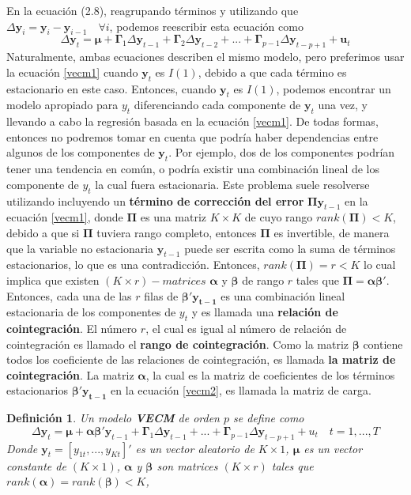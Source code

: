 \documentclass[12pt, twoside]{book}\usepackage[]{graphicx}\usepackage[]{color}
\let\bold\boldsymbol
\let\bf\mathbf
\numberwithin{equation}{section}
\numberwithin{theorem}{section}
\numberwithin{teorema}{section}
\newtheorem{defi}{Definición}
\newenvironment{defin}
      {\begin{shaded}\begin{defi}}
      {\end{defi}\end{shaded}}
\numberwithin{defi}{section}
\numberwithin{prop}{section}
\numberwithin{defi}{section}
\theoremstyle{plain}
\begin{document}
En la ecuación (2.8), reagrupando términos y utilizando que $\Delta \bf{y}_{i} = \bf{y}_{i}-\bf{y}_{i-1}\quad \forall i$, podemos reescribir esta ecuación como 
\begin{equation}\label{vecm1}
\Delta \bf{y}_{t}=\bold{\mu}+\bold{\Gamma}_{1}\Delta \bf{y}_{t-1}+\bold{\Gamma}_{2}\Delta \bf{y}_{t-2}+...+\bold{\Gamma}_{p-1}\Delta \bf{y}_{t-p+1}+\bf{u}_{t}
\end{equation} 
Naturalmente, ambas ecuaciones describen el mismo modelo, pero preferimos usar la ecuación \eqref{vecm1} cuando $\bf{y}_{t}$ es $I(1)$, debido a que cada término es estacionario en este caso. Entonces, cuando $\bf{y}_{t}$ es $I(1)$, podemos encontrar un modelo apropiado para $y_{t}$ diferenciando cada componente de $\bf{y}_{t}$ una vez, y llevando a cabo la regresión basada en la ecuación \eqref{vecm1}. De todas formas, entonces no podremos tomar en cuenta que podría haber dependencias entre algunos de los componentes de $\bf{y}_{t}$. Por ejemplo, dos de los componentes podrían tener una tendencia en común, o podría existir una combinación lineal de los componente de $y_{t}$ la cual fuera estacionaria. Este problema suele resolverse utilizando incluyendo un \textbf{término de corrección del error} $\bold{\Pi}\bf{y}_{t-1}$ en la ecuación \eqref{vecm1}, donde $\bold{\Pi}$ es una matriz $K\times K$ de cuyo rango $rank(\bold{\Pi})<K$, debido a que si $\bold{\Pi}$ tuviera rango completo, entonces $\bold{\Pi}$  es invertible, de manera que la variable no estacionaria $\bf{y}_{t-1}$ puede ser escrita como la suma de términos estacionarios, lo que es una contradicción. Entonces, $rank(\bold{\Pi})=r<K$ lo cual implica que existen $(K\times r)-matrices$ $\boldsymbol{\alpha}$ y $\boldsymbol{\beta}$ de rango $r$ tales que $\bold{\Pi}=\boldsymbol{\alpha}\boldsymbol{\beta}'$. Entonces, cada una de las $r$ filas de $\boldsymbol{\beta}'\bf{y_{t-1}}$ es una combinación lineal estacionaria de los componentes de $y_{t}$ y es llamada una \textbf{relación de cointegración}. El número $r$, el cual es igual al número de relación de cointegración es llamado el \textbf{rango de cointegración}. Como la matriz $\boldsymbol{\beta}$ contiene todos los coeficiente de las relaciones de cointegración, es llamada \textbf{la matriz de cointegración}. La matriz $\boldsymbol{\alpha}$, la cual es la matriz de coeficientes de los términos estacionarios $\boldsymbol{\beta}'\bf{y_{t-1}}$ en la ecuación \eqref{vecm2}, es llamada la matriz de carga. 
\begin{defin}
Un modelo \textbf{VECM} de orden $p$ se define como 
\begin{equation}\label{vecm2}
\Delta \bf{y}_{t}=\boldsymbol{\mu}+\boldsymbol{\alpha\beta}'
\bf{y}_{t-1}+\bold{\Gamma}_{1}\Delta \bf{y}_{t-1}+...+\bold{\Gamma}_{p-1}\Delta \bf{y}_{t-p+1}+u_{t} \quad t=1,...,T
\end{equation}
Donde $\bf{y}_{t}=\left[y_{1t},...,y_{Kt}\right]'$ es un vector aleatorio de $K\times 1$, $\boldsymbol{\mu}$ es un vector constante de $(K\times 1)$, $\boldsymbol{\alpha}$ y $\boldsymbol{\beta}$ son matrices $(K\times r)$ tales que $rank(\boldsymbol{\alpha})=rank(\boldsymbol{\beta})<K$, 
\end{defin} 
\end{document}
